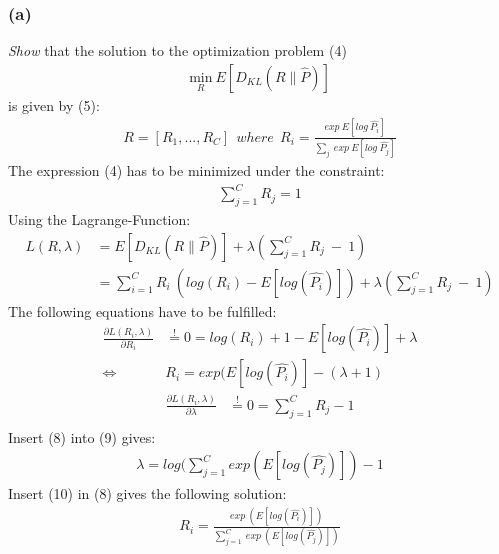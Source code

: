 \documentclass{article}
\begin{document}
\subsubsection*{(a)}
\textit{Show} that the solution to the optimization problem (4)\\
\begin{equation}
\begin{aligned}
\underset{R}{\text{min}}~ E[D_{KL} (R\parallel\hat{P})]
\end{aligned}
\end{equation}
is given by (5):\\
\begin{equation}
\begin{aligned}
R=[R_1,...,R_C] ~~ where~~ R_i = \frac{exp~E[log~\hat{P_i}]}{\sum \limits _{j}~exp~E[log~\hat{P_j}]}
\end{aligned}
\end{equation}
The expression (4) has to be minimized under the constraint:
\begin{equation}
\begin{aligned}
\sum \limits _{j=1}^{C}R_j = 1
\end{aligned}
\end{equation}
Using the Lagrange-Function:
\begin{equation}
\begin{aligned}
L(R,\lambda)&=E[D_{KL} (R\parallel\hat{P})] +\lambda(\sum \limits _{j=1}^{C}R_j~ -~ 1)\\
&=\sum \limits _{i=1}^{C}R_i~(log(R_i) - E[log(\hat{P_i})])+\lambda(\sum \limits _{j=1}^{C}R_j~ -~ 1)
\end{aligned}
\end{equation}
The following equations have to be fulfilled:
\begin{equation}
\begin{aligned}
\frac{\partial L(R_i, \lambda)}{\partial R_i} &\overset{!}{=} 0 = log(R_i)+1-E[log(\hat{P_i})] + \lambda \\
\Leftrightarrow ~ & R_i = exp(E[log(\hat{P_i})]-(\lambda+1)
\end{aligned}
\end{equation}
\begin{equation}
\begin{aligned}
\frac{\partial L(R_i, \lambda)}{\partial \lambda} &\overset{!}{=} 0 = \sum \limits _{j=1}^{C}R_j - 1\\
\end{aligned}
\end{equation}
Insert (8) into (9) gives:
\begin{equation}
\begin{aligned}
\lambda=log(\sum \limits _{j=1}^{C}exp(E[log(\hat{P_j})])-1
\end{aligned}
\end{equation}
Insert (10) in (8) gives the following solution:
\begin{equation}
\begin{aligned}
R_i = \frac{exp~(E[log(\hat{P_i})])}{\sum \limits _{j=1}^{C}~exp~(E[log(\hat{P_j})])}
\end{aligned}
\end{equation}
\end{document}
